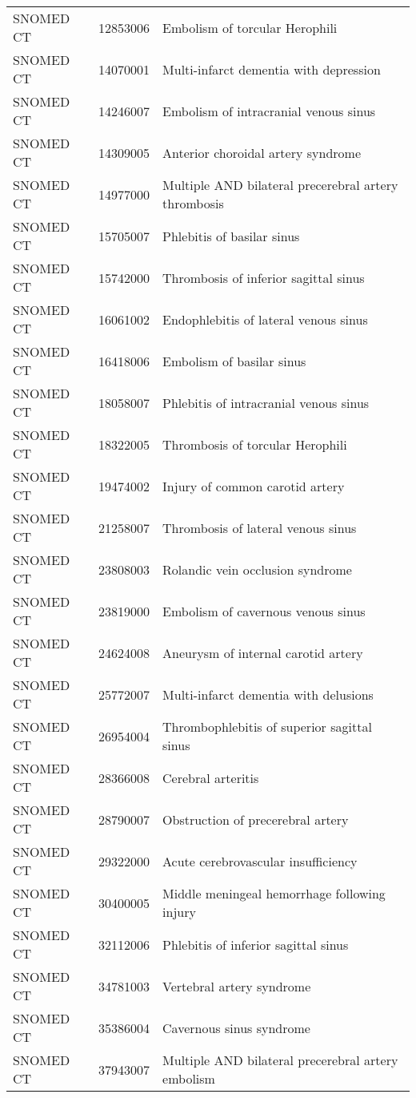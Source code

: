 \begin{longtable}{p{}p{}p{}}
  SNOMED CT & 12853006 & Embolism of torcular Herophili \\ 
  SNOMED CT & 14070001 & Multi-infarct dementia with depression \\ 
  SNOMED CT & 14246007 & Embolism of intracranial venous sinus \\ 
  SNOMED CT & 14309005 & Anterior choroidal artery syndrome \\ 
  SNOMED CT & 14977000 & Multiple AND bilateral precerebral artery thrombosis \\ 
  SNOMED CT & 15705007 & Phlebitis of basilar sinus \\ 
  SNOMED CT & 15742000 & Thrombosis of inferior sagittal sinus \\ 
  SNOMED CT & 16061002 & Endophlebitis of lateral venous sinus \\ 
  SNOMED CT & 16418006 & Embolism of basilar sinus \\ 
  SNOMED CT & 18058007 & Phlebitis of intracranial venous sinus \\ 
  SNOMED CT & 18322005 & Thrombosis of torcular Herophili \\ 
  SNOMED CT & 19474002 & Injury of common carotid artery \\ 
  SNOMED CT & 21258007 & Thrombosis of lateral venous sinus \\ 
  SNOMED CT & 23808003 & Rolandic vein occlusion syndrome \\ 
  SNOMED CT & 23819000 & Embolism of cavernous venous sinus \\ 
  SNOMED CT & 24624008 & Aneurysm of internal carotid artery \\ 
  SNOMED CT & 25772007 & Multi-infarct dementia with delusions \\ 
  SNOMED CT & 26954004 & Thrombophlebitis of superior sagittal sinus \\ 
  SNOMED CT & 28366008 & Cerebral arteritis \\ 
  SNOMED CT & 28790007 & Obstruction of precerebral artery \\ 
  SNOMED CT & 29322000 & Acute cerebrovascular insufficiency \\ 
  SNOMED CT & 30400005 & Middle meningeal hemorrhage following injury \\ 
  SNOMED CT & 32112006 & Phlebitis of inferior sagittal sinus \\ 
  SNOMED CT & 34781003 & Vertebral artery syndrome \\ 
  SNOMED CT & 35386004 & Cavernous sinus syndrome \\ 
  SNOMED CT & 37943007 & Multiple AND bilateral precerebral artery embolism \\ 

\end{longtable}
